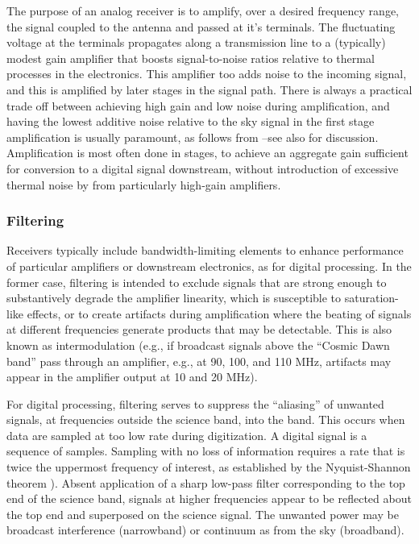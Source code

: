 The purpose of an analog receiver is to amplify, over a desired frequency range, the signal coupled to the antenna and passed at it's terminals.  The fluctuating voltage at the terminals propagates along a transmission line to a (typically) modest gain amplifier that boosts signal-to-noise ratios relative to thermal processes in the electronics.  This amplifier too adds noise to the incoming signal, and this is amplified by later stages in the signal path.  There is always a practical trade off between achieving high gain and low noise during amplification, and having the lowest additive noise relative to the sky signal in the first stage amplification is usually paramount, as follows from \cite{friis46}--see also \cite{pozar98} for discussion.  Amplification is most often done in stages, to achieve an aggregate gain sufficient for conversion to a digital signal downstream, without introduction of excessive thermal noise by from particularly high-gain amplifiers. 


\subsubsection{Filtering}

Receivers typically include bandwidth-limiting elements to enhance performance of particular amplifiers or downstream electronics, as for digital processing.  In the former case, filtering is intended to exclude signals that are strong enough to substantively degrade the amplifier linearity, which is susceptible to saturation-like effects, or to create artifacts during amplification where the beating of signals at different frequencies generate products that may be detectable. This is also known as intermodulation (e.g., if broadcast signals above the ``Cosmic Dawn band''  pass through an amplifier, e.g., at 90, 100, and 110 MHz, artifacts may appear in the amplifier output at 10 and 20 MHz).  

For digital processing, filtering serves to suppress the ``aliasing'' of unwanted signals, at frequencies outside the science band, into the band. This occurs when data are sampled at too low rate during digitization.  A digital signal is a sequence of samples.  Sampling with no loss of information requires a rate that is twice the uppermost frequency of interest, as established by the Nyquist-Shannon theorem \cite{TMS17}). Absent application of a sharp low-pass filter corresponding to the top end of the science band, signals at higher frequencies appear to be reflected about the top end and superposed on the science signal.  The unwanted power may be broadcast interference (narrowband) or continuum as from the sky (broadband).

